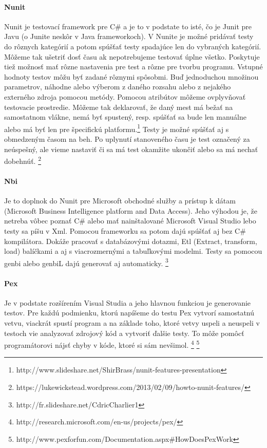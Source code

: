 \documentclass[11pt,twoside,slovak,a4paper]{article}
\begin{document}
			\paragraph{Nunit} Nunit je testovací framework pre C\# a je to v podstate to isté, čo je Junit pre Javu (o Junite neskôr v Java frameworkoch).
		V Nunite je možné pridávať testy do rôznych kategórií a potom spúšťať testy spadajúce len do vybraných kategórií. Môžeme tak ušetriť dosť času ak nepotrebujeme testovať úplne všetko.
		Poskytuje tiež možnosť mať rôzne nastavenia pre test a rôzne pre tvorbu programu.
		Vstupné hodnoty testov môžu byť zadané rôznymi spôsobmi. Buď jednoduchou množinou parametrov, náhodne alebo výberom z daného rozsahu alebo z nejakého externého zdroja pomocou metódy.
		Pomocou atribútov môžeme ovplyvňovať testovacie prostredie. Môžeme tak deklarovať, že daný mest má bežať na samostatnom vlákne, nemá byť spustený, resp. spúšťať sa bude len manuálne alebo má byť len pre špecifickú platformu.\footnote{http://www.slideshare.net/ShirBrass/nunit-features-presentation}
		Testy je možné spúšťať aj s obmedzeným časom na beh. Po uplynutí stanoveného času je test označený za neúspešný, ale vieme nastaviť či sa má test okamžite ukončiť alebo sa má nechať dobehnúť. \footnote{https://lukewickstead.wordpress.com/2013/02/09/howto-nunit-features/}
		
		\paragraph{Nbi} Je to doplnok do Nunit pre Microsoft obchodné služby a prístup k dátam (Microsoft Business Intelligence platform and Data Access). Jeho výhodou je, že netreba vôbec poznať C\# alebo mať nainštalované Microsoft Visual Studio lebo testy sa píšu v Xml. Pomocou frameworku sa potom dajú spúšťať aj bez C\# kompilátora. Dokáže pracovať s databázovými dotazmi, Etl (Extract, transform, load) balíčkami a aj s viacrozmernými a tabuľkovými modelmi.
		Testy sa pomocou genbi alebo genbiL dajú generovať aj automaticky. \footnote{http://fr.slideshare.net/CdricCharlier1}
		
		\paragraph{Pex} Je v podstate rozšírením Visual Studia a jeho hlavnou funkciou je generovanie testov. Pre každú podmienku, ktorú napíšeme do testu Pex vytvorí samostatnú vetvu, viackrát spustí program a na základe toho, ktoré vetvy uspeli a neuspeli v testoch vie analyzovať zdrojový kód a vytvoriť ďalšie testy. To môže pomôcť programátorovi nájsť chyby v kóde, ktoré si sám nevšimol. \footnote{http://research.microsoft.com/en-us/projects/pex/}
		\footnote{http://www.pexforfun.com/Documentation.aspx\#HowDoesPexWork}
		
		
			
			
					
			

			
			
			
	
	
	
	
\end{document}
